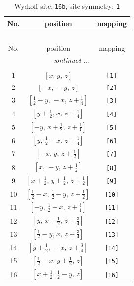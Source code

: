 \documentclass[fleqn,8pt]{jsarticle}
\begin{document}
\begin{longtable}{ccc}
\caption{Wyckoff site: {\tt 16b}, site symmetry: {\tt 1}}
 \\
 \hline \hline
No. & position & mapping \\ \hline \endfirsthead

\multicolumn{2}{l}{\tablename\ \thetable{}} \\
 \hline \hline
No. & position & mapping \\ \hline \endhead

 \hline \hline
\multicolumn{2}{r}{\footnotesize\it continued ...} \\ \endfoot

 \hline \hline
\multicolumn{2}{r}{} \\ \endlastfoot

1 & $\left[ x,\, y,\, z \right]$ & {\tt [1]} \\ \hline
2 & $\left[ - x,\, - y,\, z \right]$ & {\tt [2]} \\ \hline
3 & $\left[ \frac{1}{2} - y,\, - x,\, z + \frac{1}{4} \right]$ & {\tt [3]} \\ \hline
4 & $\left[ y + \frac{1}{2},\, x,\, z + \frac{1}{4} \right]$ & {\tt [4]} \\ \hline
5 & $\left[ - y,\, x + \frac{1}{2},\, z + \frac{1}{4} \right]$ & {\tt [5]} \\ \hline
6 & $\left[ y,\, \frac{1}{2} - x,\, z + \frac{1}{4} \right]$ & {\tt [6]} \\ \hline
7 & $\left[ - x,\, y,\, z + \frac{1}{2} \right]$ & {\tt [7]} \\ \hline
8 & $\left[ x,\, - y,\, z + \frac{1}{2} \right]$ & {\tt [8]} \\ \hline
9 & $\left[ x + \frac{1}{2},\, y + \frac{1}{2},\, z + \frac{1}{2} \right]$ & {\tt [9]} \\ \hline
10 & $\left[ \frac{1}{2} - x,\, \frac{1}{2} - y,\, z + \frac{1}{2} \right]$ & {\tt [10]} \\ \hline
11 & $\left[ - y,\, \frac{1}{2} - x,\, z + \frac{3}{4} \right]$ & {\tt [11]} \\ \hline
12 & $\left[ y,\, x + \frac{1}{2},\, z + \frac{3}{4} \right]$ & {\tt [12]} \\ \hline
13 & $\left[ \frac{1}{2} - y,\, x,\, z + \frac{3}{4} \right]$ & {\tt [13]} \\ \hline
14 & $\left[ y + \frac{1}{2},\, - x,\, z + \frac{3}{4} \right]$ & {\tt [14]} \\ \hline
15 & $\left[ \frac{1}{2} - x,\, y + \frac{1}{2},\, z \right]$ & {\tt [15]} \\ \hline
16 & $\left[ x + \frac{1}{2},\, \frac{1}{2} - y,\, z \right]$ & {\tt [16]} \\
\end{longtable}
\end{document}
